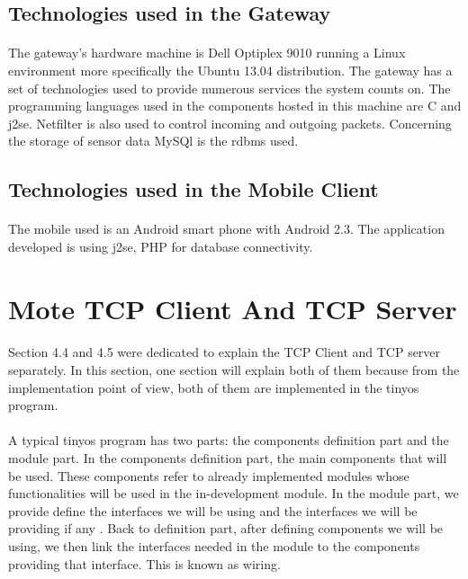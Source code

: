 \documentclass[oneside,12pt,a4paper,final]{book}
\begin{document}
\subsection{Technologies used in the Gateway}
\paragraph{}
The gateway's hardware machine is Dell Optiplex 9010 running a Linux environment more specifically the Ubuntu 13.04 distribution. The gateway has a set of technologies used to provide numerous services the system counts on. The programming languages used in the components hosted in this machine are C and \gls{j2se}. Netfilter is also used to control incoming and outgoing packets. Concerning the storage of sensor data MySQl is the \gls{rdbms} used.

\subsection{Technologies used in the Mobile Client}
\paragraph{}
The mobile used is an Android smart phone with Android 2.3. The application developed is using \gls{j2se}, PHP for database connectivity.

\section{Mote TCP Client And TCP Server}
\paragraph{}
Section 4.4 and 4.5 were dedicated to explain the TCP Client and TCP server separately. In this section, one section will explain both of them because from the implementation point of view,  both of them are implemented in the \gls{tinyos} program.
\paragraph{}
A typical \gls{tinyos} program has two parts: the components definition part and the module part. In the components definition part, the main components that will be used. These components refer to already implemented modules whose functionalities will be used in the in-development module. In the module part, we provide define the interfaces we will be using and the interfaces we will be providing if any \cite{ref14}. Back to definition part, after defining components we will be using, we then link the interfaces needed in the module to the components providing that interface. This is known as wiring.
\end{document}
